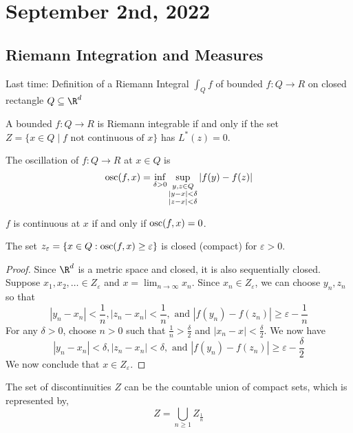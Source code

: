 \section{September 2nd, 2022}

\subsection{Riemann Integration and Measures}
Last time: Definition of a Riemann Integral $\int_Q f$ of bounded $f : Q \to R$ on closed rectangle $Q
\subseteq \R^d$

\begin{theorem}
  A bounded $f : Q \to R$ is Riemann integrable if and only if the set $Z = \{ x \in Q \mid f
  \text{ not continuous of } x \}$ has $L^* (z) = 0$.
\end{theorem}

\begin{definition}[oscillation]
  The oscillation of $f : Q \to R$ at $x \in Q$ is
\[\operatorname*{osc}(f,x) = \inf_{\delta > 0} \sup_{\substack{y, z \in Q \\ | y - x | < \delta \\ |z - x| < \delta}} |f(y) - f(z)| \]
\end{definition}

\begin{lemma}
  $f$ is continuous at $x$ if and only if $\operatorname*{osc} (f,x) = 0$.
\end{lemma}

\begin{lemma}
  The set $z_\varepsilon = \{ x \in Q : \operatorname*{osc}(f,x) \geq \varepsilon \}$ is closed (compact) for $\varepsilon > 0$.
\end{lemma}

\begin{proof}
  Since $\R^d$ is a metric space and closed, it is also sequentially closed.
  Suppose $x_1, x_2, \ldots \in Z_\varepsilon$ and $x = \lim_{n \to \infty} x_n$.
  Since $x_n \in Z_\varepsilon$, we can choose $y_n, z_n$ so that
  \[|y_n - x_n| < \frac{1}{n}, |z_n - x_n| < \frac{1}{n}, \text{ and } |f(y_n) - f(z_n)| \geq \varepsilon - \frac{1}{n}\]
  For any $\delta > 0$, choose $n > 0$ such that $\frac{1}{n} > \frac{\delta}{2}$ and $|x_n - x| < \frac{\delta}{2}$.
  We now have
  \[|y_n - x_n| < \delta, |z_n - x_n| < \delta, \text{ and } |f(y_n) - f(z_n)| \geq \varepsilon - \frac{\delta}{2}\]
  We now conclude that $x \in Z_\varepsilon$.
\end{proof}

\begin{notation}
The set of discontinuities $Z$ can be the countable union of compact sets, which is represented by,
\[ Z = \bigcup_{n \geq 1} Z_{\frac{1}{n}} \]
\end{notation}

